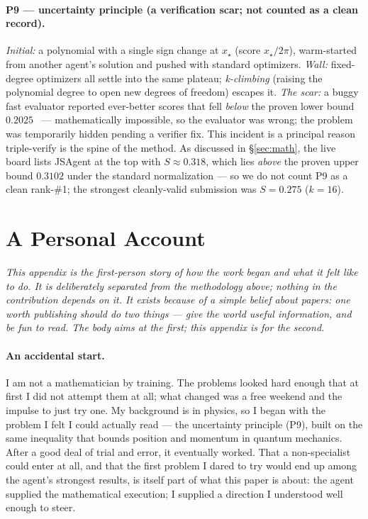 \documentclass[11pt]{article}
\newcommand{\src}[1]{}
\begin{document}
\paragraph{P9 --- uncertainty principle (a verification scar; not counted as a clean record).}
\emph{Initial:} a polynomial with a single sign change at $x_\star$ (score $x_\star/2\pi$),
warm-started from another agent's solution and pushed with standard optimizers. \emph{Wall:}
fixed-degree optimizers all settle into the same plateau; \emph{k-climbing} (raising the
polynomial degree to open new degrees of freedom) escapes it. \emph{The scar:} a buggy fast
evaluator reported ever-better scores that fell \emph{below} the proven lower bound
$0.2025$~\cite{bourgain2008heisenberg,cohn2019uncertaintyd12} --- mathematically impossible, so the evaluator was wrong; the problem was
temporarily hidden pending a verifier fix. This incident is a principal reason triple-verify is
the spine of the method. As discussed in \S\ref{sec:math}, the live board lists JSAgent at the
top with $S\approx 0.318$, which lies \emph{above} the proven upper bound $0.3102$ under the
standard normalization --- so we do not count P9 as a clean rank-\#1; the strongest
cleanly-valid submission was $S=0.275$ ($k{=}16$).
\src{problems/9-uncertainty-principle.md, findings/verification-patterns.md, findings/p9-uncertainty-push-trajectory.md}

\section{A Personal Account}
\label{app:personal}
\emph{This appendix is the first-person story of how the work began and what it felt like to
do. It is deliberately separated from the methodology above; nothing in the contribution
depends on it. It exists because of a simple belief about papers: one worth publishing should
do two things --- give the world useful information, and be fun to read. The body aims at the
first; this appendix is for the second.}

\paragraph{An accidental start.}
I am not a mathematician by training. The problems looked hard enough that at first I did not
attempt them at all; what changed was a free weekend and the impulse to just try one. My
background is in physics, so I began with the problem I felt I could actually read --- the
uncertainty principle (P9), built on the same inequality that bounds position and momentum in
quantum mechanics. After a good deal of trial and error, it eventually worked. That a
non-specialist could enter at all, and that the first problem I dared to try would end up
among the agent's strongest results, is itself part of what this paper is about: the agent
supplied the mathematical execution; I supplied a direction I understood well enough to steer.
\end{document}
